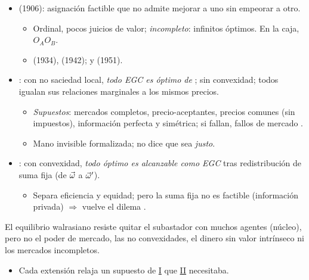 \documentclass{article}
\begin{document}
\begin{columnas}
\begin{itemize}
\item {} (1906): asignación factible que no admite mejorar a uno sin empeorar a otro.
  \begin{itemize}
  \item Ordinal, pocos juicios de valor; \emph{incompleto}: infinitos óptimos. En la caja,  $O_AO_B$.
  \item {} (1934),  (1942);  y  (1951).
  \end{itemize}
\end{itemize}
\begin{itemize}
\item {}: con no saciedad local, \emph{todo EGC es óptimo de }; sin convexidad; todos igualan sus relaciones marginales a los mismos precios.
  \begin{itemize}
  \item \emph{Supuestos}: mercados completos, precio-aceptantes, precios comunes (sin impuestos), información perfecta y simétrica; si fallan, fallos de mercado  .
  \item Mano invisible formalizada; no dice que sea \emph{justo}.
  \end{itemize}
\item {}: con convexidad, \emph{todo óptimo es alcanzable como EGC} tras redistribución de suma fija (de $\vec{\omega}$ a $\vec{\omega}'$).
  \begin{itemize}
  \item Separa eficiencia y equidad; pero la suma fija no es factible (información privada) $\Rightarrow$ vuelve el dilema .
  \end{itemize}
\end{itemize}

\begin{ideaclave}
El equilibrio walrasiano resiste quitar el subastador con muchos agentes (núcleo), pero no el poder de mercado, las no convexidades, el dinero sin valor intrínseco ni los mercados incompletos.
\end{ideaclave}
\begin{itemize}
\item Cada extensión relaja un supuesto de \hyperref[rep:I]{I} que \hyperref[rep:II]{II} necesitaba.
\end{itemize}


\end{columnas}
\end{document}
